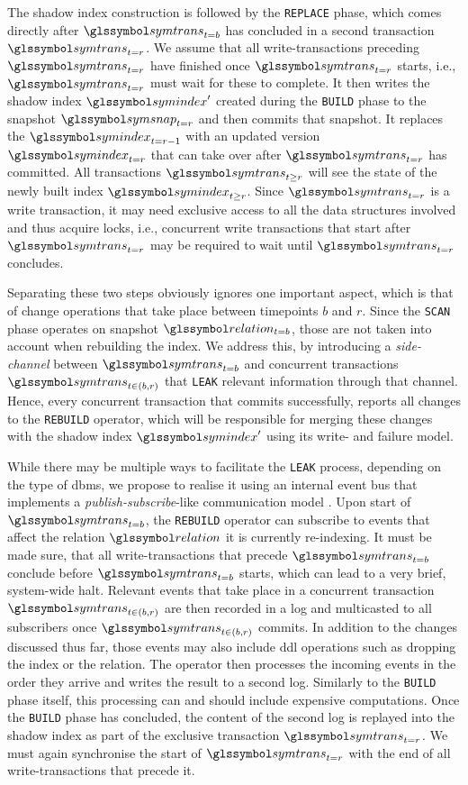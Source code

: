 The shadow index construction is followed by the \texttt{REPLACE} phase, which comes directly after $\symtrans_{t=b}$ has concluded in a second transaction $\symtrans_{t=r}$. We assume that all write-transactions preceding $\symtrans_{t=r}$ have finished once $\symtrans_{t=r}$ starts, i.e., $\symtrans_{t=r}$ must wait for these to complete. It then writes the shadow index $\symindex^{\prime}$ created during the \texttt{BUILD} phase to the snapshot $\symsnap_{t=r}$ and then commits that snapshot.  It replaces the $\symindex_{t=r-1}$ with an updated version $\symindex_{t=r}$ that can take over after $\symtrans_{t=r}$  has committed. All transactions $\symtrans_{t \geq r}$ will see the state of the newly built index $\symindex_{t \geq r}$. Since $\symtrans_{t=r}$ is a write transaction, it may need exclusive access to all the data structures involved and thus acquire locks, i.e., concurrent write transactions that start after $\symtrans_{t=r}$  may be required to wait until $\symtrans_{t=r}$ concludes.

Separating these two steps obviously ignores one important aspect, which is that of change operations that take place between timepoints $b$ and $r$. Since the \texttt{SCAN} phase operates on snapshot $\relation_{t=b}$, those are not taken into account when rebuilding the index. We address this, by introducing a \emph{side-channel} between $\symtrans_{t=b}$ and concurrent transactions $\symtrans_{t \in (b, r)}$ that \texttt{LEAK} relevant information through that channel. Hence, every concurrent transaction that commits successfully, reports all changes to the \texttt{REBUILD} operator, which will be responsible for merging these changes with the shadow index $\symindex^{\prime}$ using its write- and failure model.

While there may be multiple ways to facilitate the \texttt{LEAK} process, depending on the type of \acrshort{dbms}, we propose to realise it using an internal event bus that implements a \emph{publish-subscribe}-like communication model \cite{Chan:1998Transactional}. Upon start of $\symtrans_{t=b}$, the \texttt{REBUILD} operator can subscribe to events that affect the relation $\relation$ it is currently re-indexing. It must be made sure, that all write-transactions that precede $\symtrans_{t=b}$ conclude before $\symtrans_{t=b}$ starts, which can lead to a very brief, system-wide halt. Relevant events that take place in a concurrent transaction $\symtrans_{t \in (b, r)}$ are then recorded in a log and multicasted to all subscribers once $\symtrans_{t \in (b, r)}$ commits. In addition to the changes discussed thus far, those events may also include \acrshort{ddl} operations such as dropping the index or the relation. The operator then processes the incoming events in the order they arrive and writes the result to a second log. Similarly to the \texttt{BUILD} phase itself, this processing can and should include expensive computations. Once the \texttt{BUILD} phase has concluded, the content of the second log is replayed into the shadow index as part of the exclusive transaction $\symtrans_{t=r}$. We must again synchronise the start of $\symtrans_{t=r}$ with the end of all write-transactions that precede it.


